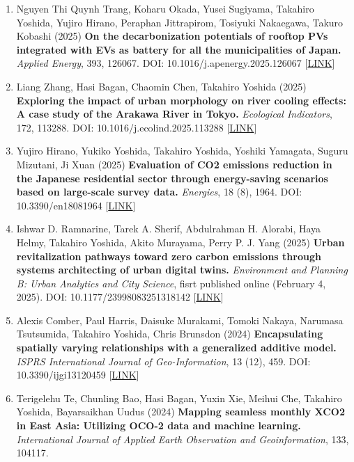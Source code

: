 \documentclass[
]{book}
\providecommand{\tightlist}{%
  \setlength{\itemsep}{0pt}\setlength{\parskip}{0pt}}
\begin{document}
\begin{enumerate}
\def\labelenumi{\arabic{enumi}.}
\tightlist
\item
  Nguyen Thi Quynh Trang, Koharu Okada, Yusei Sugiyama, Takahiro Yoshida, Yujiro Hirano, Peraphan Jittrapirom, Tosiyuki Nakaegawa, Takuro Kobashi (2025)
  \textbf{On the decarbonization potentials of rooftop PVs integrated with EVs as battery for all the municipalities of Japan.}
  \emph{Applied Energy}, 393, 126067.
  DOI: 10.1016/j.apenergy.2025.126067 {[}\href{https://www.sciencedirect.com/science/article/pii/S0306261925007974}{LINK}{]}
\item
  Liang Zhang, Hasi Bagan, Chaomin Chen, Takahiro Yoshida (2025)
  \textbf{Exploring the impact of urban morphology on river cooling effects: A case study of the Arakawa River in Tokyo.}
  \emph{Ecological Indicators}, 172, 113288.
  DOI: 10.1016/j.ecolind.2025.113288 {[}\href{https://doi.org/10.1016/j.ecolind.2025.113288}{LINK}{]}
\item
  Yujiro Hirano, Yukiko Yoshida, Takahiro Yoshida, Yoshiki Yamagata, Suguru Mizutani, Ji Xuan (2025)
  \textbf{Evaluation of CO2 emissions reduction in the Japanese residential sector through energy-saving scenarios based on large-scale survey data.}
  \emph{Energies}, 18 (8), 1964.
  DOI: 10.3390/en18081964 {[}\href{https://doi.org/10.3390/en18081964}{LINK}{]}
\item
  Ishwar D. Ramnarine, Tarek A. Sherif, Abdulrahman H. Alorabi, Haya Helmy, Takahiro Yoshida, Akito Murayama, Perry P. J. Yang (2025)
  \textbf{Urban revitalization pathways toward zero carbon emissions through systems architecting of urban digital twins.}
  \emph{Environment and Planning B: Urban Analytics and City Science}, fisrt published online (February 4, 2025).
  DOI: 10.1177/23998083251318142 {[}\href{https://doi.org/10.1177/23998083251318142}{LINK}{]}
\item
  Alexis Comber, Paul Harris, Daisuke Murakami, Tomoki Nakaya, Narumasa Tsutsumida, Takahiro Yoshida, Chris Brunsdon (2024)
  \textbf{Encapsulating spatially varying relationships with a generalized additive model.}
  \emph{ISPRS International Journal of Geo-Information}, 13 (12), 459.
  DOI: 10.3390/ijgi13120459 {[}\href{https://doi.org/10.3390/ijgi13120459}{LINK}{]}
\item
  Terigelehu Te, Chunling Bao, Hasi Bagan, Yuxin Xie, Meihui Che, Takahiro Yoshida, Bayarsaikhan Uudus (2024)
  \textbf{Mapping seamless monthly XCO2 in East Asia: Utilizing OCO-2 data and machine learning.}
  \emph{International Journal of Applied Earth Observation and Geoinformation}, 133, 104117.

\end{enumerate}
\end{document}
